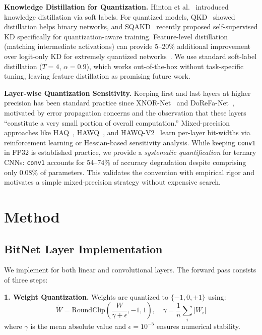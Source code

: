 \documentclass[10pt]{article}
\begin{document}
\textbf{Knowledge Distillation for Quantization.}
Hinton et al.~\cite{hinton2015distilling} introduced knowledge distillation via soft labels. For quantized models, QKD~\cite{kim2019qkd} showed distillation helps binary networks, and SQAKD~\cite{zhao2024sqakd} recently proposed self-supervised KD specifically for quantization-aware training. Feature-level distillation (matching intermediate activations) can provide 5--20\% additional improvement over logit-only KD for extremely quantized networks~\cite{elthakeb2020dcq}. We use standard soft-label distillation ($T=4$, $\alpha=0.9$), which works out-of-the-box without task-specific tuning, leaving feature distillation as promising future work.

\textbf{Layer-wise Quantization Sensitivity.}
Keeping first and last layers at higher precision has been standard practice since XNOR-Net~\cite{rastegari2016xnornet} and DoReFa-Net~\cite{zhou2016dorefa}, motivated by error propagation concerns and the observation that these layers ``constitute a very small portion of overall computation.'' Mixed-precision approaches like HAQ~\cite{wang2019haq}, HAWQ~\cite{dong2019hawq}, and HAWQ-V2~\cite{dong2020hawqv2} learn per-layer bit-widths via reinforcement learning or Hessian-based sensitivity analysis. While keeping \texttt{conv1} in FP32 is established practice, we provide a \emph{systematic quantification} for \bitnetb{} ternary CNNs: \texttt{conv1} accounts for 54--74\% of accuracy degradation despite comprising only 0.08\% of parameters. This validates the convention with empirical rigor and motivates a simple mixed-precision strategy without expensive search.


\section{Method}
\label{sec:method}

\subsection{BitNet Layer Implementation}

We implement \bitnetb{} for both linear and convolutional layers. The forward pass consists of three steps:

\textbf{1. Weight Quantization.} Weights are quantized to $\{-1, 0, +1\}$ using:
\begin{equation}
    \tilde{W} = \text{RoundClip}\left(\frac{W}{\gamma + \epsilon}, -1, 1\right), \quad \gamma = \frac{1}{n}\sum_{i}|W_i|
\end{equation}
where $\gamma$ is the mean absolute value and $\epsilon=10^{-5}$ ensures numerical stability.
\end{document}
